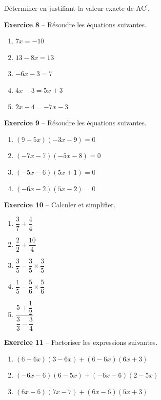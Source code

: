\documentclass[12pt,a4paper,french]{article}
\begin{document}
\begin{center}
\end{center}
Déterminer en justifiant la valeur exacte de \ensuremath{\mathrm{A}}\ensuremath{\mathrm{C}^\prime}.
\bigskip

\noindent\textbf{Exercice 8} -- Résoudre les équations suivantes.
\begin{enumerate}
\item $7x = -10$
\item $13 - 8x = 13$
\item $-6x - 3 = 7$
\item $4x - 3 = 5x + 3$
\item $2x - 4 = -7x - 3$
\end{enumerate}
\bigskip

\noindent\textbf{Exercice 9} -- Résoudre les équations suivantes.
\begin{enumerate}
\item $(9 - 5x)(-3x - 9) = 0$
\item $(-7x - 7)(-5x - 8) = 0$
\item $(-5x - 6)(5x + 1) = 0$
\item $(-6x - 2)(5x - 2) = 0$
\end{enumerate}
\bigskip

\noindent\textbf{Exercice 10} -- Calculer et simplifier.
\begin{enumerate}
\item $\dfrac{3}{7} + \dfrac{4}{4}$
\item $\dfrac{2}{2} + \dfrac{10}{4}$
\item $\dfrac{3}{5} - \dfrac{3}{5} \times \dfrac{3}{5}$
\item $\dfrac{1}{5} - \dfrac{5}{6} \times \dfrac{5}{6}$
\item $\dfrac{5 + \dfrac{1}{2}}{\dfrac{3}{3} - \dfrac{3}{4}}$
\end{enumerate}
\bigskip

\noindent\textbf{Exercice 11} -- Factoriser les expressions suivantes.
\begin{enumerate}
\item $(6 - 6x)(3 - 6x) + (6 - 6x)(6x + 3)$
\item $(-6x - 6)(6 - 5x) + (-6x - 6)(2 - 5x)$
\item $(6x - 6)(7x - 7) + (6x - 6)(5x + 3)$
\end{enumerate}
\bigskip
\end{document}
